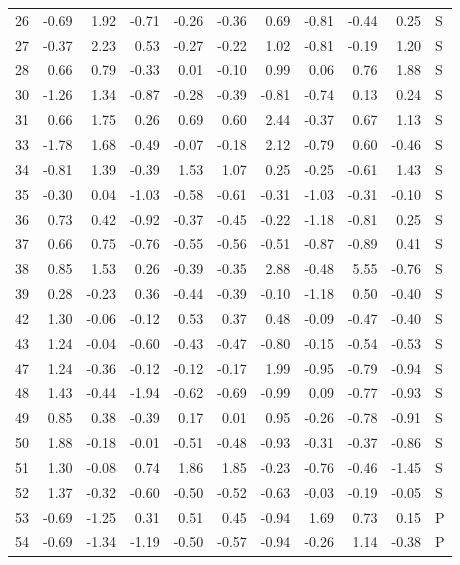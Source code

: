 \begin{table}[ht]
\begin{tabular}{rrrrrrrrrrl}
  26 & -0.69 & 1.92 & -0.71 & -0.26 & -0.36 & 0.69 & -0.81 & -0.44 & 0.25 & S \\ 
  27 & -0.37 & 2.23 & 0.53 & -0.27 & -0.22 & 1.02 & -0.81 & -0.19 & 1.20 & S \\ 
  28 & 0.66 & 0.79 & -0.33 & 0.01 & -0.10 & 0.99 & 0.06 & 0.76 & 1.88 & S \\ 
  30 & -1.26 & 1.34 & -0.87 & -0.28 & -0.39 & -0.81 & -0.74 & 0.13 & 0.24 & S \\ 
  31 & 0.66 & 1.75 & 0.26 & 0.69 & 0.60 & 2.44 & -0.37 & 0.67 & 1.13 & S \\ 
  33 & -1.78 & 1.68 & -0.49 & -0.07 & -0.18 & 2.12 & -0.79 & 0.60 & -0.46 & S \\ 
  34 & -0.81 & 1.39 & -0.39 & 1.53 & 1.07 & 0.25 & -0.25 & -0.61 & 1.43 & S \\ 
  35 & -0.30 & 0.04 & -1.03 & -0.58 & -0.61 & -0.31 & -1.03 & -0.31 & -0.10 & S \\ 
  36 & 0.73 & 0.42 & -0.92 & -0.37 & -0.45 & -0.22 & -1.18 & -0.81 & 0.25 & S \\ 
  37 & 0.66 & 0.75 & -0.76 & -0.55 & -0.56 & -0.51 & -0.87 & -0.89 & 0.41 & S \\ 
  38 & 0.85 & 1.53 & 0.26 & -0.39 & -0.35 & 2.88 & -0.48 & 5.55 & -0.76 & S \\ 
  39 & 0.28 & -0.23 & 0.36 & -0.44 & -0.39 & -0.10 & -1.18 & 0.50 & -0.40 & S \\ 
  42 & 1.30 & -0.06 & -0.12 & 0.53 & 0.37 & 0.48 & -0.09 & -0.47 & -0.40 & S \\ 
  43 & 1.24 & -0.04 & -0.60 & -0.43 & -0.47 & -0.80 & -0.15 & -0.54 & -0.53 & S \\ 
  47 & 1.24 & -0.36 & -0.12 & -0.12 & -0.17 & 1.99 & -0.95 & -0.79 & -0.94 & S \\ 
  48 & 1.43 & -0.44 & -1.94 & -0.62 & -0.69 & -0.99 & 0.09 & -0.77 & -0.93 & S \\ 
  49 & 0.85 & 0.38 & -0.39 & 0.17 & 0.01 & 0.95 & -0.26 & -0.78 & -0.91 & S \\ 
  50 & 1.88 & -0.18 & -0.01 & -0.51 & -0.48 & -0.93 & -0.31 & -0.37 & -0.86 & S \\ 
  51 & 1.30 & -0.08 & 0.74 & 1.86 & 1.85 & -0.23 & -0.76 & -0.46 & -1.45 & S \\ 
  52 & 1.37 & -0.32 & -0.60 & -0.50 & -0.52 & -0.63 & -0.03 & -0.19 & -0.05 & S \\ 
  53 & -0.69 & -1.25 & 0.31 & 0.51 & 0.45 & -0.94 & 1.69 & 0.73 & 0.15 & P \\ 
  54 & -0.69 & -1.34 & -1.19 & -0.50 & -0.57 & -0.94 & -0.26 & 1.14 & -0.38 & P \\ 

\end{tabular}
\end{table}
